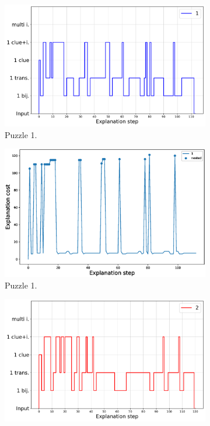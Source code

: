 \begin{figure}[t!]
		\centering
		\begin{subfigure}{.5\textwidth}
				\centering
				\includegraphics[width=0.9\linewidth]{figures/plot_cost_steps_1.pdf}
				\caption{Puzzle 1.}
				\label{fig:composition_puzzle:p1}
		\end{subfigure}%
		\begin{subfigure}{.5\textwidth}
				\centering
				\includegraphics[width=0.84\linewidth]{figures/1.eps}
				\caption{Puzzle 1.}
				\label{fig:cost_puzzle:p1}
		\end{subfigure}
		\begin{subfigure}{.5\textwidth}
				\centering
				\includegraphics[width=0.9\linewidth]{figures/plot_cost_steps_2.pdf}

\end{subfigure}
\end{figure}
